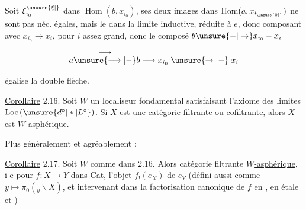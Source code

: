 
Soit $\xi_{i_0}^{\unsure{\xi|\vphantom{\xi}}}$ dans $\operatorname{Hom}(b,x_{i_0})$, ses deux images dans $\operatorname{Hom}(a,x_{i_{\unsure{0|\vphantom{0}}}})$ ne sont pas néc. égales, mais le  dans la limite inductive, réduite à $e$, donc   composant avec $x_{i_0}\to x_i$, pour $i$ assez grand, donc le composé $b\unsure{\mathbin{-}|\to}x_{i_0}\mathbin{-}x_i$

\[
a\overset{\displaystyle\longrightarrow}{\unsure{\longrightarrow|-}}b\longrightarrow x_{i_0}\mathrel{\unsure{\to|-}}x_i
\]

 égalise la double flèche.

\uline{Corollaire} 2.16. Soit $W$ un localiseur fondamental satisfaisant l'axiome des limites $\mathrm{Loc}\,(\unsure{d^\circ|*|L^\circ})$. Si $X$  est une catégorie filtrante ou cofiltrante, alors $X$ est $W$-asphérique.

Plus généralement et agréablement :

\reversemarginpar{}\normalmarginpar

\uline{Corollaire} 2.17. Soit $W$ comme dans 2.16. Alors  catégorie filtrante \uline{ $W$-asphérique}, i-e pour   $f:X\longrightarrow Y$ dans Cat,  l'objet $f_!(e_X)$ de $e_Y$  (défini aussi comme  $y\longmapsto\pi_0({}_{y}\backslash X)$, et intervenant dans la factorisation canonique de $f$ en , en  étale et     )

